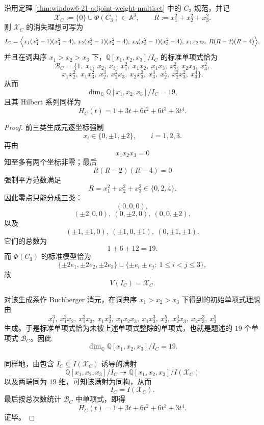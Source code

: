 \begin{theorem}\label{thm:window6-c3-support-vanishing-ideal-hilbert}
沿用定理 \ref{thm:window6-21-adjoint-weight-multiset} 中的 \(C_3\) 规范，并记
\[
\mathscr X_C:=\{0\}\cup \Phi(C_3)\subset \mathbb A^3,
\qquad
R:=x_1^2+x_2^2+x_3^2.
\]
则 \(\mathscr X_C\) 的消失理想可写为
\[
I_C=
\Bigl\langle
x_1(x_1^2-1)(x_1^2-4),\,
x_2(x_2^2-1)(x_2^2-4),\,
x_3(x_3^2-1)(x_3^2-4),\,
x_1x_2x_3,\,
R(R-2)(R-4)
\Bigr\rangle.
\]
并且在词典序 \(x_1>x_2>x_3\) 下，\(\mathbb Q[x_1,x_2,x_3]/I_C\) 的标准单项式恰为
\[
\mathcal B_C=
\{
1,\ x_1,\ x_2,\ x_3,\ x_1^2,\ x_1x_2,\ x_1x_3,\ x_2^2,\ x_2x_3,\ x_3^2,
\]
\[
x_1x_2^2,\ x_1x_3^2,\ x_2^3,\ x_2^2x_3,\ x_2x_3^2,\ x_3^3,\ x_2^4,\ x_2^2x_3^2,\ x_3^4
\}.
\]
从而
\[
\dim_{\mathbb Q}\mathbb Q[x_1,x_2,x_3]/I_C=19,
\]
且其 Hilbert 系列同样为
\[
\boxed{\;
H_C(t)=1+3t+6t^2+6t^3+3t^4.\;}
\]
\end{theorem}
\begin{proof}
前三类生成元逐坐标强制
\[
x_i\in\{0,\pm 1,\pm 2\},
\qquad i=1,2,3.
\]
再由
\[
x_1x_2x_3=0
\]
知至多有两个坐标非零；最后
\[
R(R-2)(R-4)=0
\]
强制平方范数满足
\[
R=x_1^2+x_2^2+x_3^2\in\{0,2,4\}.
\]
因此零点只能分成三类：
\[
(0,0,0),
\]
\[
(\pm 2,0,0),\ (0,\pm 2,0),\ (0,0,\pm 2),
\]
以及
\[
(\pm 1,\pm 1,0),\ (\pm 1,0,\pm 1),\ (0,\pm 1,\pm 1).
\]
它们的总数为
\[
1+6+12=19.
\]
而 \(\Phi(C_3)\) 的标准模型恰为
\[
\{\pm 2e_1,\pm 2e_2,\pm 2e_3\}
\sqcup
\{\pm e_i\pm e_j:\ 1\le i<j\le 3\},
\]
故
\[
V(I_C)=\mathscr X_C.
\]

对该生成系作 Buchberger 消元，在词典序 \(x_1>x_2>x_3\) 下得到的初始单项式理想由
\[
x_1^3,\ x_1^2x_2,\ x_1^2x_3,\ x_1x_2^3,\ x_1x_2x_3,\ x_1x_3^3,\ x_2^5,\ x_2^3x_3,\ x_2x_3^3,\ x_3^5
\]
生成。于是标准单项式恰为未被上述单项式整除的单项式，也就是题述的 \(19\) 个单项式 \(\mathcal B_C\)。因此
\[
\dim_{\mathbb Q}\mathbb Q[x_1,x_2,x_3]/I_C=19.
\]

同样地，由包含 \(I_C\subseteq I(\mathscr X_C)\) 诱导的满射
\[
\mathbb Q[x_1,x_2,x_3]/I_C\twoheadrightarrow \mathbb Q[x_1,x_2,x_3]/I(\mathscr X_C)
\]
以及两端同为 \(19\) 维，可知该满射为同构，从而
\[
I_C=I(\mathscr X_C).
\]
最后按总次数统计 \(\mathcal B_C\) 中单项式，即得
\[
H_C(t)=1+3t+6t^2+6t^3+3t^4.
\]
证毕。
\end{proof}

